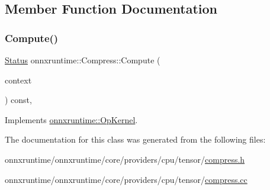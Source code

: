 \subsection{Member Function Documentation}
\mbox{\label{classonnxruntime_1_1Compress_a3fb89293bd5c713c2ec5b76a19d2c183}} 
\subsubsection{\texorpdfstring{Compute()}{Compute()}}
{\footnotesize\ttfamily \mbox{\hyperlink{classonnxruntime_1_1common_1_1Status}{Status}} onnxruntime\+::\+Compress\+::\+Compute (\begin{DoxyParamCaption}\item[{\mbox{\hyperlink{classonnxruntime_1_1OpKernelContext}{Op\+Kernel\+Context}} $\ast$}]{context }\end{DoxyParamCaption}) const\hspace{0.3cm}{\ttfamily [override]}, {\ttfamily [virtual]}}



Implements \mbox{\hyperlink{classonnxruntime_1_1OpKernel_a9eca8656a78b1b3ab9d3351a12798650}{onnxruntime\+::\+Op\+Kernel}}.



The documentation for this class was generated from the following files\+:\begin{DoxyCompactItemize}
\item 
onnxruntime/onnxruntime/core/providers/cpu/tensor/\mbox{\hyperlink{cpu_2tensor_2compress_8h}{compress.\+h}}\item 
onnxruntime/onnxruntime/core/providers/cpu/tensor/\mbox{\hyperlink{cpu_2tensor_2compress_8cc}{compress.\+cc}}\end{DoxyCompactItemize}
